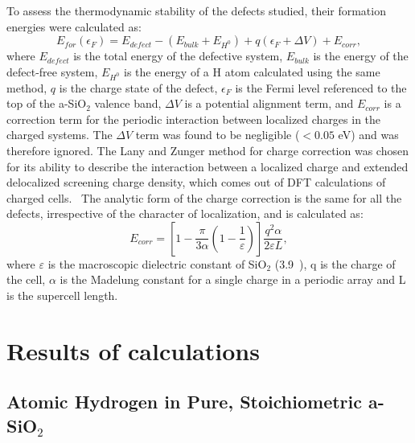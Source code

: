 \documentclass[aps,prb,reprint,superscriptaddress,showpacs]{revtex4-1}
\begin{document}
To assess the thermodynamic stability of the defects studied, their formation energies were calculated as:
\begin{equation}
E_{for}(\epsilon_F)=E_{defect}-(E_{bulk}+E_{H^0})+q(\epsilon_F + \Delta V) + E_{corr},
\label{eq:formation_fermi}
\end{equation}
where $E_{defect}$ is the total energy of the defective system, $E_{bulk}$ is the energy of the defect-free system, $E_{H^0}$ is the energy of a H atom calculated using the same method, $q$ is the charge state of the defect, $\epsilon_F$ is the Fermi level referenced to the top of the a-SiO$_2$ valence band, $\Delta V$ is a potential alignment term, and $E_{corr}$ is a correction term for the periodic interaction between localized charges in the charged systems. The $\Delta V$ term was found to be negligible ($< 0.05$ eV) and was therefore ignored. The Lany and Zunger method for charge correction was chosen for its ability to describe the interaction between a localized charge and extended delocalized screening charge density, which comes out of DFT calculations of charged cells.~\cite{lany_zunger,finite_size} The analytic form of the charge correction is the same for all the defects, irrespective of the character of localization, and is calculated as:
\begin{equation}
E_{corr}=\left [ 1 - \frac{\pi}{3 \alpha}\left (1-\frac{1}{\varepsilon}\right)\right ]\frac{q^2\alpha}{2 \varepsilon L},
\label{eq:ecorr}
\end{equation}
where $\varepsilon$ is the macroscopic dielectric constant of SiO$_2$ (3.9~\cite{sio2_dielectric}), q is the charge of the cell, $\alpha$ is the Madelung constant for a single charge in a periodic array and L is the supercell length. 

\section{Results of calculations}
\subsection{Atomic Hydrogen in Pure, Stoichiometric a-SiO$_2$}
\end{document}
